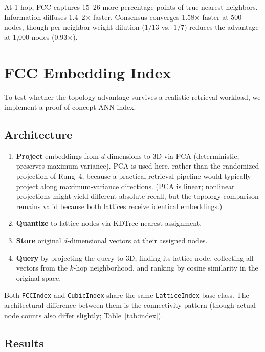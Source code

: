 \documentclass[11pt]{article}
\begin{document}
At 1-hop, FCC captures 15--26 more percentage points of true
nearest neighbors. Information diffuses 1.4--2$\times$ faster.
Consensus converges 1.58$\times$ faster at 500 nodes, though
per-neighbor weight dilution ($1/13$ vs.\ $1/7$) reduces the
advantage at 1{,}000 nodes (0.93$\times$).

\section{FCC Embedding Index}
\label{sec:index}

To test whether the topology advantage survives a realistic
retrieval workload, we implement a proof-of-concept ANN index.

\subsection{Architecture}

\begin{enumerate}
  \item \textbf{Project} embeddings from $d$ dimensions to 3D via
    PCA (deterministic, preserves maximum variance). PCA is used
    here, rather than the randomized projection of Rung~4, because a
    practical retrieval pipeline would typically project along
    maximum-variance directions. (PCA is linear; nonlinear projections
    might yield different absolute recall, but the topology comparison
    remains valid because both lattices receive identical embeddings.)
  \item \textbf{Quantize} to lattice nodes via KDTree
    nearest-assignment.
  \item \textbf{Store} original $d$-dimensional vectors at their
    assigned nodes.
  \item \textbf{Query} by projecting the query to 3D, finding its
    lattice node, collecting all vectors from the $k$-hop
    neighborhood, and ranking by cosine similarity in the original
    space.
\end{enumerate}

Both \texttt{FCCIndex} and \texttt{CubicIndex} share the same
\texttt{LatticeIndex} base class. The architectural difference between them is the
connectivity pattern (though actual node counts also differ slightly;
Table~\ref{tab:index}).

\subsection{Results}
\end{document}
